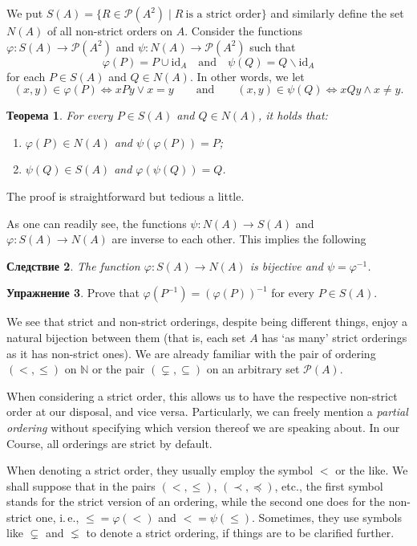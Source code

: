 \documentclass[12pt,notitlepage]{article}
\theoremstyle{plain}
\newtheorem{thm}{Теорема}[section]
\newtheorem{corr}[thm]{Следствие}
\theoremstyle{definition}
\newtheorem{exc}[thm]{Упражнение}
\theoremstyle{plain}
\newcommand{\N}{\mathbb{N}}
\newcommand{\sbs}{\subseteq}
\renewcommand{\setminus}{\smallsetminus}
\newcommand{\mP}{\mathcal{P}}
\renewcommand{\phi}{\varphi}
\newcommand{\id}{\mathrm{id}}
\newcommand{\1}{\mathbf{1}}
\newcommand{\0}{\mathbf{0}}
\begin{document}
We put $S(A) = \{ R \in \mP(A^2) \mid R\ \mbox{is a strict order} \}$
and similarly define the set $N(A)$ of all non-strict orders on $A$. Consider the functions $\phi\colon S(A) \to \mP(A^2)$ and $\psi\colon N(A) \to \mP(A^2)$ such that
$$\phi(P) = P \cup \id_A\quad \mbox{and}\quad \psi(Q) = Q \setminus \id_A$$
for each $P \in S(A)$ and $Q \in N(A)$. In other words, we let
$$
(x,y) \in \phi(P) \iff xPy \vee x = y\qquad \mbox{and}\qquad
(x,y) \in \psi(Q) \iff xQy \wedge x \neq y.
$$

\begin{thm} For every $P \in S(A)$ and $Q \in N(A)$, it holds that:
	\begin{enumerate}
		\item $\phi(P) \in N(A)$ and $\psi(\phi(P)) = P$;
		\item $\psi(Q) \in S(A)$ and $\phi(\psi(Q)) = Q$.
	\end{enumerate}
\end{thm}
\noindent The proof is straightforward but tedious a little.

As one can readily see, the functions $\psi\colon N(A) \to S(A)$ and $\phi\colon S(A) \to N(A)$ are inverse to each other. This implies the following
\begin{corr}
	The function $\phi\colon S(A) \to N(A)$ is bijective and $\psi = \phi^{-1}$.
\end{corr}
\begin{exc}
	Prove that $\phi(P^{-1}) = (\phi(P))^{-1}$ for every $P \in S(A)$.
\end{exc}

We see that strict and non-strict orderings, despite being different things, enjoy a natural bijection between them (that is, each set $A$ has `as many' strict orderings as it has non-strict ones). We are already familiar with the pair of ordering $({<},{\leq})$ on $\N$ or the pair $({\subsetneq},{\sbs})$ on an arbitrary set $\mP(A)$.

When considering a strict order, this allows us to have the respective non-strict order at our disposal, and vice versa. Particularly, we can freely mention a \emph{partial ordering} without specifying which version thereof we are speaking about. In our Course, all orderings are strict by default.

When denoting a strict order, they usually employ the symbol ${<}$ or the like. We shall suppose that in the pairs $({<},{\leq})$, $({\prec}, {\preceq})$, etc., the first symbol stands for the strict version of an ordering, while the second one does for the non-strict one, i.\,e., ${\leq} = \phi({<})$ and ${<} = \psi({\leq})$. Sometimes, they use symbols like ${\subsetneq}$ and ${\lneq}$ to denote a strict ordering, if things are to be clarified further.
\end{document}
